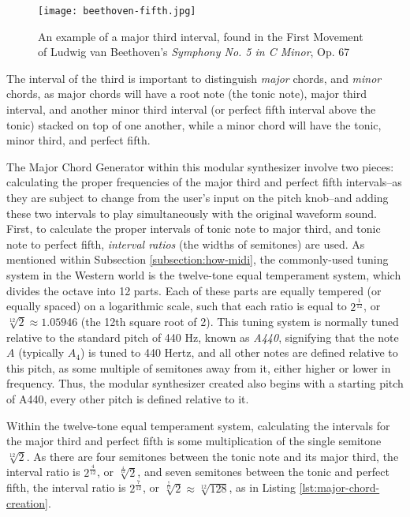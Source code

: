 \begin{figure}
  \centering
  \texttt{[image: beethoven-fifth.jpg]}
  \caption{An example of a major third interval, found in the First Movement of Ludwig van Beethoven's \textit{Symphony No. 5 in C Minor}, Op. 67}
  \label{fig:beethoven-fifth}
\end{figure}


The interval of the third is important to distinguish \textit{major} chords, and \textit{minor} chords, as major chords will have a root note (the tonic note), major third interval, and another minor third interval (or perfect fifth interval above the tonic) stacked on top of one another, while a minor chord will have the tonic, minor third, and perfect fifth.

The Major Chord Generator within this modular synthesizer involve two pieces: calculating the proper frequencies of the major third and perfect fifth intervals--as they are subject to change from the user's input on the pitch knob--and adding these two intervals to play simultaneously with the original waveform sound. First, to calculate the proper intervals of tonic note to major third, and tonic note to perfect fifth, \textit{interval ratios} (the widths of semitones) are used. As mentioned within Subsection \ref{subsection:how-midi}, the commonly-used tuning system in the Western world is the twelve-tone equal temperament system, which divides the octave into 12 parts. Each of these parts are equally tempered (or equally spaced) on a logarithmic scale, such that each ratio is equal to $2^\frac{1}{12}$, or $\sqrt[12]{2} \approx 1.05946$ (the 12th square root of 2). This tuning system is normally tuned relative to the standard pitch of 440 Hz, known as \textit{A440}, signifying that the note $A$ (typically $A_4$) is tuned to 440 Hertz, and all other notes are defined relative to this pitch, as some multiple of semitones away from it, either higher or lower in frequency. Thus,  the modular synthesizer created also begins with a starting pitch of A440, every other pitch is defined relative to it. 

Within the twelve-tone equal temperament system, calculating the intervals for the major third and perfect fifth is some multiplication of the single semitone $\sqrt[12]{2}$. As there are four semitones between the tonic note and its major third, the interval ratio is $2^\frac{4}{12}$, or $\sqrt[\frac{4}{12}]{2}$, and seven semitones between the tonic and perfect fifth, the interval ratio is $2^\frac{7}{12}$, or $\sqrt[\frac{7}{12}]{2} \approx \sqrt[12]{128}$, as in Listing \ref{lst:major-chord-creation}. %


